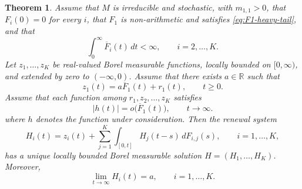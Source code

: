 \documentclass[reqno,final,11pt]{amsart}
\newcommand{\R}{\mathbb R}
\theoremstyle{plain}
\newtheorem{theorem}{Theorem}[section]
\theoremstyle{definition}
\theoremstyle{remark}
\numberwithin{equation}{section}
\begin{document}
\begin{theorem}\label{thm:mixed-renewal}
Assume that \(M\) is irreducible and stochastic, with \(m_{1,1}>0\), that \(F_i(0)=0\) for every \(i\), that \(F_1\) is non-arithmetic and satisfies \eqref{eq:F1-heavy-tail}, and that
\[
  \int_0^\infty\overline F_i(t)\,dt<\infty,
  \qquad i=2,\dots,K.
\]
Let \(z_1,\dots,z_K\) be real-valued Borel measurable functions, locally bounded on \([0,\infty)\), and extended by zero to \((-\infty,0)\). Assume that there exists \(a\in\R\) such that
\begin{equation}\label{eq:z1-decomp-renewal}
  z_1(t)=a\overline F_1(t)+r_1(t),
  \qquad t\ge0.
\end{equation}
Assume that each function among \(r_1,z_2,\dots,z_K\) satisfies
\begin{equation*}\tag{H}
  |h(t)|=o\bigl(\overline F_1(t)\bigr),
  \qquad t\to\infty.
\end{equation*}
where \(h\) denotes the function under consideration.
Then the renewal system
\begin{equation}\label{eq:mixed-renewal-system-final}
  H_i(t)
  =
  z_i(t)
  +
  \sum_{j=1}^K
  \int_{[0,t]}H_j(t-s)\,dF_{i,j}(s),
  \qquad i=1,\dots,K,
\end{equation}
has a unique locally bounded Borel measurable solution \(H=(H_1,\dots,H_K)\). Moreover,
\begin{equation}\label{eq:mixed-renewal-limit-final}
  \lim_{t\to\infty}H_i(t)=a,
  \qquad i=1,\dots,K.
\end{equation}
\end{theorem}
\end{document}
